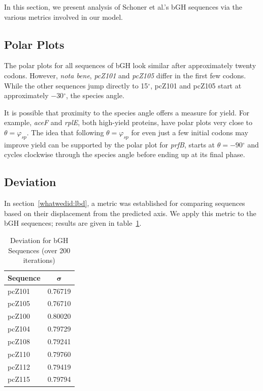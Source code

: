 \documentclass[10pt,twocolumn,draft]{article}
\newcommand{\degree}{\ensuremath{^\circ}}
\newcommand{\prfB}{\emph{prfB}}
\begin{document}
In this section, we present analysis of Schoner et al.'s bGH sequences via the various metrics involved in our model.

\subsection{Polar Plots}

The polar plots for all sequences of bGH look similar after approximately twenty codons.  
However, \emph{nota bene}, \emph{pcZ101} and \emph{pcZ105} differ in the first few codons.
While the other sequences jump directly to 15$\degree$, pcZ101 and pcZ105 start at approximately $-30\degree$, the species angle.

It is possible that proximity to the species angle offers a measure for yield.
For example, \emph{aceF} and \emph{rplE}, both high-yield proteins, have polar plots very close to $\theta = \varphi_{sp}$.
The idea that following $\theta = \varphi_{sp}$ for even just a few initial codons may improve yield can be supported by the polar plot for 
\prfB, starts at $\theta = -90\degree$ and cycles clockwise through the species angle before ending up at its final phase.

\subsection{Deviation}

In section~\ref{whatwedid:lbd}, a metric was established for comparing sequences based on their displacement from the predicted axis.
We apply this metric to the bGH sequences; results are given in table~\ref{deviation}.

\begin{table}[!h]
\begin{center}
\begin{tabular}{|lc|}\hline
\textbf{Sequence} & $\mathbf{\sigma}$ \\\hline
pcZ101 & 0.76719\\
pcZ105 & 0.76710\\\hline
pcZ100 & 0.80020\\
pcZ104 & 0.79729\\
pcZ108 & 0.79241\\
pcZ110 & 0.79760\\
pcZ112 & 0.79419\\
pcZ115 & 0.79794\\\hline
\end{tabular}
\caption{Deviation for bGH Sequences (over 200 iterations)}
\label{deviation}
\end{center}
\end{table}
\end{document}
